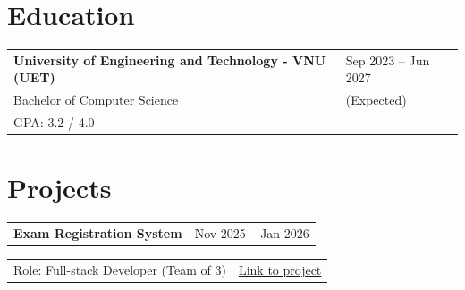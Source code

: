 \documentclass[a4paper,12pt]{article}
\makeatletter
\newenvironment{jobshort}[2]
    {
    \begin{tabularx}{\linewidth}{@{}l X r@{}}
    \textbf{#1} & \hfill &  #2 \\[3.75pt]
    \end{tabularx}
    }
    {
    }
\newenvironment{joblong}[2]
    {
    \begin{tabularx}{\linewidth}{@{}l X r@{}}
    \textbf{#1} & \hfill &  #2 \\[3.75pt]
    \end{tabularx}
    \begin{minipage}[t]{\linewidth}
    \begin{itemize}[nosep,after=\strut, leftmargin=1em, itemsep=3pt,label=--]
    }
    {
    \end{itemize}
    \end{minipage}    
    }
\makeatother
\begin{document}
%
%
%

\section{Education}
\begin{tabularx}{\linewidth}{@{}l X@{}}	
\textbf{University of Engineering and Technology - VNU (UET)} & \hfill \normalsize{Sep 2023 -- Jun 2027} \\
Bachelor of Computer Science & \hfill \normalsize{(Expected)} \\
GPA: 3.2 / 4.0 \\
\end{tabularx}
  
\section{Projects}
\begin{tabularx}{\linewidth}{@{}X r@{}}
\textbf{Exam Registration System} & \normalsize{Nov 2025 -- Jan 2026} \\
\end{tabularx}
\begin{tabularx}{\linewidth}{@{}X r@{}}
Role: Full-stack Developer (Team of 3) & \href{https://github.com/quachthanhhung12349/BTLWeb_ExamReg}{Link to project} \\
\end{tabularx}
\end{document}
